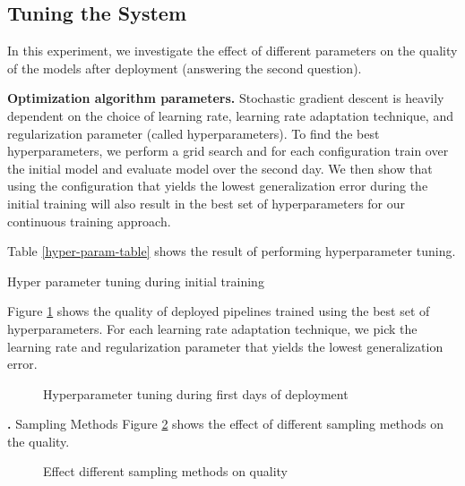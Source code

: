 \subsection{Tuning the System}
In this experiment, we investigate the effect of different parameters on the quality of the models after deployment (answering the second question).

\textbf{Optimization algorithm parameters. }
Stochastic gradient descent is heavily dependent on the choice of learning rate, learning rate adaptation technique, and regularization parameter (called hyperparameters). 
To find the best hyperparameters, we perform a grid search and for each configuration train over the initial model and evaluate model over the second day.
We then show that using the configuration that yields the lowest generalization error during the initial training will also result in the best set of hyperparameters for our continuous training approach.

Table \ref{hyper-param-table} shows the result of performing hyperparameter tuning.
\begin{table}[t]
\centering
\begin{adjustbox}{max width=\textwidth}

\end{adjustbox}
\caption{Hyper parameter tuning during initial training}
\label{hyper-param-table}
\end{table}

Figure \ref{hyper-param-figure} shows the quality of deployed pipelines trained using the best set of hyperparameters. 
For each learning rate adaptation technique, we pick the learning rate and regularization parameter that yields the lowest generalization error.

\begin{figure}
\centering
\resizebox{\columnwidth}{!}{}
\caption{Hyperparameter tuning during first days of deployment}
\label{hyper-param-figure}
\end{figure}

\textbf. {Sampling Methods}
Figure \ref{sampling-method-figure} shows the effect of different sampling methods on the quality.
\begin{figure}
\centering
\resizebox{\columnwidth}{!}{}
\caption{Effect different sampling methods on quality}
\label{sampling-method-figure}
\end{figure}

